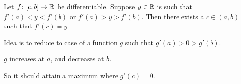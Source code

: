 \documentclass[10pt,aspectratio=169]{beamer}
\begin{document}
\begin{frame}

\begin{theorem}[Darboux]
Let $f \colon [a,b] \to {\mathbb{R}}$ be differentiable.  Suppose $y \in {\mathbb{R}}$ is such
that $f'(a) < y < f'(b)$ or
$f'(a) > y > f'(b)$.
\pause
Then there exists a $c \in (a,b)$ such that $f'(c) =
y$.
\end{theorem}

\pause
Idea is to reduce to case of a function $g$ such that
$g'(a) > 0 > g'(b)$.

\pause
\medskip

$g$ increases at $a$, and decreases at $b$.

\pause
\medskip

So it should attain a maximum where $g'(c) = 0$.

\pause
\medskip

\begin{center}
\end{center}

\end{frame}
\end{document}
